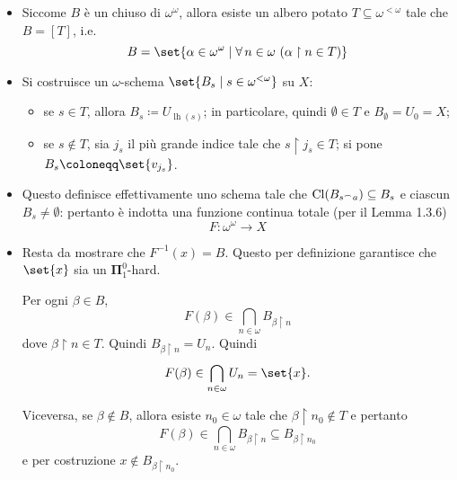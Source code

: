 \documentclass{article}
\newcommand{\1}{\mathds{1}}
\newcommand{\concat}{\null^{\frown}} %
\begin{document}
\begin{itemize}
\item Siccome \(B\) è un chiuso di \(\omega^{\omega}\), allora esiste un albero potato \(T \subseteq \omega^{<\omega}\) tale che \(B=[T]\), i.e.
\begin{equation*}
  	B = \set{\alpha \in \omega^{\omega}\mid \forall\,n \in \omega\ (\alpha\upharpoonright n \in T)}
\end{equation*}
\item Si costruisce un \(\omega\)-schema \(\set{B_{s}\mid s \in \omega^{<\omega}}\) su \(X\):
\begin{itemize}
\item se \(s \in T\), allora \(B_{s} \coloneqq U_{\operatorname{lh}(s)}\); in particolare, quindi \(\emptyset \in T\) e \(B_{\emptyset} = U_{0} = X\);
\item se \(s\notin T\), sia \(j_{s}\) il più grande indice tale che \(s\upharpoonright j_{s} \in T\); si pone \(B_{s} \coloneqq \set{v_{j_{s}}}\).
\end{itemize}
\item Questo definisce effettivamente uno schema tale che \(\operatorname{Cl}(B_{s\concat a}) \subseteq B_{s}\) e ciascun \(B_{s}\neq \emptyset\): pertanto è indotta una funzione continua totale (per il Lemma 1.3.6)
\begin{equation*}
  	F:\omega^{\omega}\to X
\end{equation*}
\item Resta da mostrare che \(F^{-1}(x) = B\). Questo per definizione garantisce che \(\set{x}\) sia un \(\bm{\Pi}_{1}^{0}\)-hard.

Per ogni \(\beta \in B\),
\begin{equation*}
  	F(\beta) \in \bigcap_{n \in \omega} B_{\beta\upharpoonright n}
\end{equation*}
dove \(\beta\upharpoonright n \in T\). Quindi \(B_{\beta\upharpoonright n} = U_{n}\). Quindi
\begin{equation*}
  	F(\beta) \in \bigcap_{n \in \omega} U_{n} = \set{x}.
\end{equation*}

Viceversa, se \(\beta \notin B\), allora esiste \(n_{0} \in \omega\) tale che \(\beta\upharpoonright n_{0} \notin T\) e pertanto
\begin{equation*}
  	F(\beta) \in \bigcap_{n \in\omega} B_{\beta\upharpoonright n} \subseteq B_{\beta\upharpoonright n_{0}}
\end{equation*}
e per costruzione \(x\notin B_{\beta\upharpoonright n_{0}}\).
\end{itemize}
\end{document}
